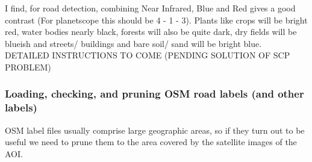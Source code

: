 \documentclass[12pt,a4paper]{scrartcl}
\begin{document}
I find, for road detection, combining Near Infrared, Blue and Red gives a good contrast (For planetscope this should be 4 - 1 - 3).
Plants like crops will be bright red, water bodies nearly black, forests will also be quite dark, dry fields will be blueish and streets/ buildings and bare soil/ sand will be bright blue.\\

DETAILED INSTRUCTIONS TO COME (PENDING SOLUTION OF SCP PROBLEM)

\subsubsection{Loading, checking, and pruning OSM road labels (and other labels)}
OSM label files usually comprise large geographic areas, so if they turn out to be useful we need to prune them to the area covered by the satellite images of the AOI.
\end{document}
